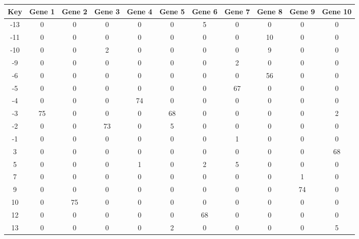 \begin{tabular}{|c|c|c|c|c|c|c|c|c|c|c|}
\hline
Key & Gene 1 & Gene 2 & Gene 3 & Gene 4 & Gene 5 & Gene 6 & Gene 7 & Gene 8 & Gene 9 & Gene 10 \\
\hline
-13 & 0 & 0 & 0 & 0 & 0 & 5 & 0 & 0 & 0 & 0 \\
-11 & 0 & 0 & 0 & 0 & 0 & 0 & 0 & 10 & 0 & 0 \\
-10 & 0 & 0 & 2 & 0 & 0 & 0 & 0 & 9 & 0 & 0 \\
-9 & 0 & 0 & 0 & 0 & 0 & 0 & 2 & 0 & 0 & 0 \\
-6 & 0 & 0 & 0 & 0 & 0 & 0 & 0 & 56 & 0 & 0 \\
-5 & 0 & 0 & 0 & 0 & 0 & 0 & 67 & 0 & 0 & 0 \\
-4 & 0 & 0 & 0 & 74 & 0 & 0 & 0 & 0 & 0 & 0 \\
-3 & 75 & 0 & 0 & 0 & 68 & 0 & 0 & 0 & 0 & 2 \\
-2 & 0 & 0 & 73 & 0 & 5 & 0 & 0 & 0 & 0 & 0 \\
-1 & 0 & 0 & 0 & 0 & 0 & 0 & 1 & 0 & 0 & 0 \\
3 & 0 & 0 & 0 & 0 & 0 & 0 & 0 & 0 & 0 & 68 \\
5 & 0 & 0 & 0 & 1 & 0 & 2 & 5 & 0 & 0 & 0 \\
7 & 0 & 0 & 0 & 0 & 0 & 0 & 0 & 0 & 1 & 0 \\
9 & 0 & 0 & 0 & 0 & 0 & 0 & 0 & 0 & 74 & 0 \\
10 & 0 & 75 & 0 & 0 & 0 & 0 & 0 & 0 & 0 & 0 \\
12 & 0 & 0 & 0 & 0 & 0 & 68 & 0 & 0 & 0 & 0 \\
13 & 0 & 0 & 0 & 0 & 2 & 0 & 0 & 0 & 0 & 5 \\
\hline
\end{tabular}